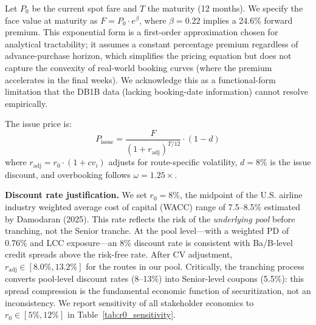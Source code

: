 \documentclass[12pt,a4paper]{article}
\begin{document}
Let $P_0$ be the current spot fare and $T$ the maturity (12 months). We specify the face value at maturity as $F = P_0 \cdot e^{\beta}$, where $\beta = 0.22$ implies a 24.6\% forward premium. This exponential form is a first-order approximation chosen for analytical tractability; it assumes a constant percentage premium regardless of advance-purchase horizon, which simplifies the pricing equation but does not capture the convexity of real-world booking curves (where the premium accelerates in the final weeks). We acknowledge this as a functional-form limitation that the DB1B data (lacking booking-date information) cannot resolve empirically.

The issue price is:
\begin{equation}
P_{\text{issue}} = \frac{F}{(1 + r_{\text{adj}})^{T/12}} \cdot (1 - d)
\label{eq:issue_price}
\end{equation}
where $r_{\text{adj}} = r_0 \cdot (1 + cv_i)$ adjusts for route-specific volatility, $d = 8\%$ is the issue discount, and overbooking follows $\omega = 1.25\times$.

\textbf{Discount rate justification.} We set $r_0 = 8\%$, the midpoint of the U.S. airline industry weighted average cost of capital (WACC) range of 7.5--8.5\% estimated by Damodaran (2025). This rate reflects the risk of the \textit{underlying pool} before tranching, not the Senior tranche. At the pool level---with a weighted PD of 0.76\% and LCC exposure---an 8\% discount rate is consistent with Ba/B-level credit spreads above the risk-free rate. After CV adjustment, $r_{\text{adj}} \in [8.0\%, 13.2\%]$ for the routes in our pool. Critically, the tranching process converts pool-level discount rates (8--13\%) into Senior-level coupons (5.5\%): this spread compression is the fundamental economic function of securitization, not an inconsistency. We report sensitivity of all stakeholder economics to $r_0 \in [5\%, 12\%]$ in Table~\ref{tab:r0_sensitivity}.
\end{document}
